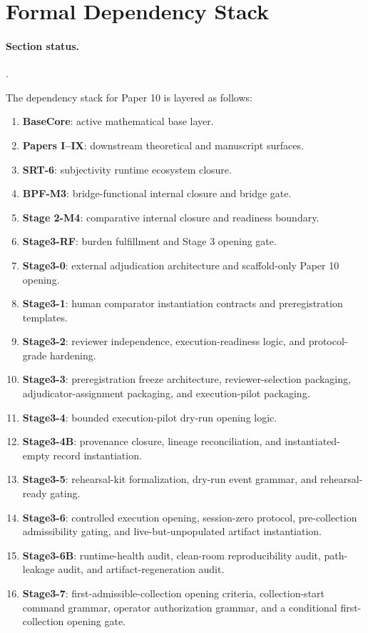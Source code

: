 \documentclass[11pt]{article}
\newcommand{\sectionstatus}[1]{\paragraph{Section status.}\texttt{\detokenize{#1}}.}
\begin{document}
\section{Formal Dependency Stack}
\sectionstatus{formalized}

The dependency stack for Paper 10 is layered as follows:

\begin{enumerate}
\item \textbf{BaseCore}: active mathematical base layer.
\item \textbf{Papers I--IX}: downstream theoretical and manuscript surfaces.
\item \textbf{SRT-6}: subjectivity runtime ecosystem closure.
\item \textbf{BPF-M3}: bridge-functional internal closure and bridge gate.
\item \textbf{Stage 2-M4}: comparative internal closure and readiness boundary.
\item \textbf{Stage3-RF}: burden fulfillment and Stage 3 opening gate.
\item \textbf{Stage3-0}: external adjudication architecture and scaffold-only Paper 10 opening.
\item \textbf{Stage3-1}: human comparator instantiation contracts and preregistration templates.
\item \textbf{Stage3-2}: reviewer independence, execution-readiness logic, and protocol-grade hardening.
\item \textbf{Stage3-3}: preregistration freeze architecture, reviewer-selection packaging, adjudicator-assignment packaging, and execution-pilot packaging.
\item \textbf{Stage3-4}: bounded execution-pilot dry-run opening logic.
\item \textbf{Stage3-4B}: provenance closure, lineage reconciliation, and instantiated-empty record instantiation.
\item \textbf{Stage3-5}: rehearsal-kit formalization, dry-run event grammar, and rehearsal-ready gating.
\item \textbf{Stage3-6}: controlled execution opening, session-zero protocol, pre-collection admissibility gating, and live-but-unpopulated artifact instantiation.
\item \textbf{Stage3-6B}: runtime-health audit, clean-room reproducibility audit, path-leakage audit, and artifact-regeneration audit.
\item \textbf{Stage3-7}: first-admissible-collection opening criteria, collection-start command grammar, operator authorization grammar, and a conditional first-collection opening gate.
\end{enumerate}
\end{document}
